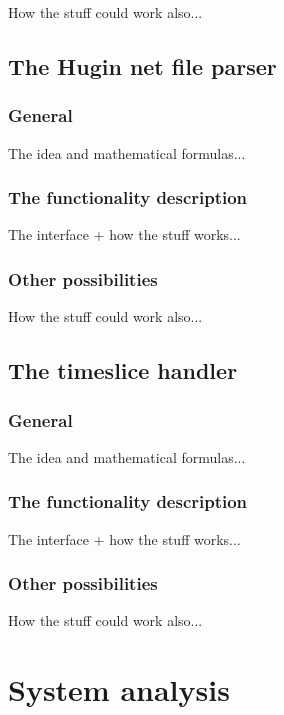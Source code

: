 \documentclass[12pt,a4paper]{report}
\begin{document}
How the stuff could work also...


\newpage
\section{The Hugin net file parser}
\subsection{General}

The idea and mathematical formulas...

\subsection{The functionality description}

The interface + how the stuff works...

\subsection{Other possibilities}

How the stuff could work also...


\newpage
\section{The timeslice handler} %
\subsection{General}

The idea and mathematical formulas...

\subsection{The functionality description}

The interface + how the stuff works...

\subsection{Other possibilities}

How the stuff could work also...



\newpage
\chapter{System analysis}
\end{document}

